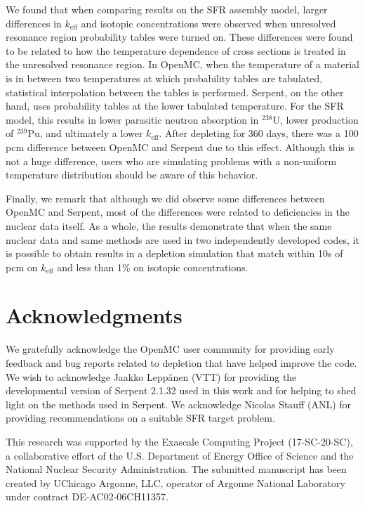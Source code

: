 \documentclass[3p,authoryear]{elsarticle}
\begin{document}
We found that when comparing results on the SFR assembly model, larger
differences in $k_\text{eff}$ and isotopic concentrations were observed when
unresolved resonance region probability tables were turned on. These differences
were found to be related to how the temperature dependence of cross sections is
treated in the unresolved resonance region. In OpenMC, when the temperature of a
material is in between two temperatures at which probability tables are
tabulated, statistical interpolation between the tables is performed. Serpent,
on the other hand, uses probability tables at the lower tabulated temperature.
For the SFR model, this results in lower parasitic neutron absorption in
$^{238}$U, lower production of $^{239}$Pu, and ultimately a lower
$k_\text{eff}$. After depleting for 360 days, there was a 100 pcm difference
between OpenMC and Serpent due to this effect. Although this is not a huge
difference, users who are simulating problems with a non-uniform temperature
distribution should be aware of this behavior.

Finally, we remark that although we did observe some differences between OpenMC
and Serpent, most of the differences were related to deficiencies in the nuclear
data itself. As a whole, the results demonstrate that when the same nuclear data
and same methods are used in two independently developed codes, it is possible
to obtain results in a depletion simulation that match within 10s of pcm on
$k_\text{eff}$ and less than 1\% on isotopic concentrations.

\section*{Acknowledgments}

We gratefully acknowledge the OpenMC user community for providing early feedback
and bug reports related to depletion that have helped improve the code. We wish
to acknowledge Jaakko Lepp{\"{a}}nen (VTT) for providing the developmental
version of Serpent 2.1.32 used in this work and for helping to shed light on the
methods used in Serpent. We acknowledge Nicolas Stauff (ANL) for providing
recommendations on a suitable SFR target problem.

This research was supported by the Exascale Computing Project (17-SC-20-SC), a
collaborative effort of the U.S. Department of Energy Office of Science and the
National Nuclear Security Administration. The submitted manuscript has been
created by UChicago Argonne, LLC, operator of Argonne National Laboratory under
contract DE-AC02-06CH11357.
\end{document}
